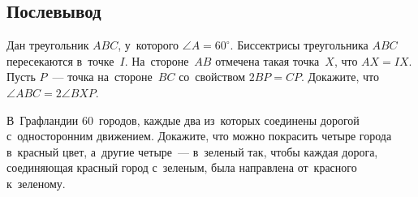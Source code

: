 


\subsection*{Послевывод}

\begin{problems}

\item
Дан треугольник $ABC$, у~которого $\angle A = 60^{\circ}$.
Биссектрисы треугольника $ABC$ пересекаются в~точке~$I$.
На~стороне~$AB$ отмечена такая точка~$X$, что $AX = IX$.
Пусть $P$~--- точка на~стороне~$BC$ со~свойством $2 BP = CP$.
Докажите, что $\angle ABC = 2 \angle BXP$.

\item
В~Графландии 60~городов, каждые два из~которых соединены дорогой
с~односторонним движением.
Докажите, что можно покрасить четыре города в~красный цвет, а~другие четыре~---
в~зеленый так, чтобы каждая дорога, соединяющая красный город с~зеленым, была
направлена от~красного к~зеленому.

\end{problems}

